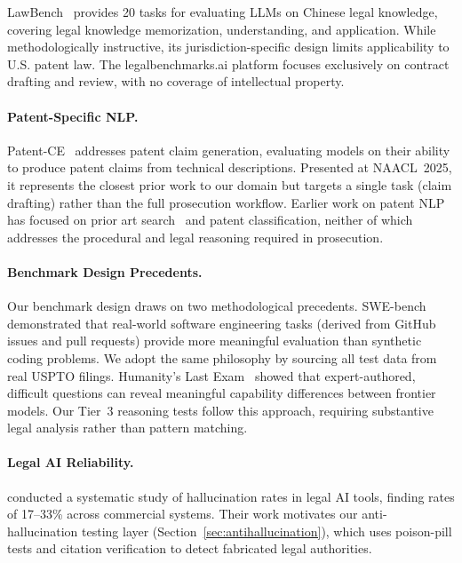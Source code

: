\documentclass[11pt]{article}
\begin{document}
LawBench~\citep{fei2023lawbench} provides 20 tasks for evaluating LLMs on Chinese legal knowledge, covering legal knowledge memorization, understanding, and application. While methodologically instructive, its jurisdiction-specific design limits applicability to U.S. patent law. The legalbenchmarks.ai platform focuses exclusively on contract drafting and review, with no coverage of intellectual property.

\paragraph{Patent-Specific NLP.}
Patent-CE~\citep{lee2025patentce} addresses patent claim generation, evaluating models on their ability to produce patent claims from technical descriptions. Presented at NAACL~2025, it represents the closest prior work to our domain but targets a single task (claim drafting) rather than the full prosecution workflow. Earlier work on patent NLP has focused on prior art search~\citep{helmers2019automating} and patent classification, neither of which addresses the procedural and legal reasoning required in prosecution.

\paragraph{Benchmark Design Precedents.}
Our benchmark design draws on two methodological precedents. SWE-bench~\citep{jimenez2023swebench} demonstrated that real-world software engineering tasks (derived from GitHub issues and pull requests) provide more meaningful evaluation than synthetic coding problems. We adopt the same philosophy by sourcing all test data from real USPTO filings. Humanity's Last Exam~\citep{phan2025humanitys} showed that expert-authored, difficult questions can reveal meaningful capability differences between frontier models. Our Tier~3 reasoning tests follow this approach, requiring substantive legal analysis rather than pattern matching.

\paragraph{Legal AI Reliability.}
\citet{magesh2025hallucination} conducted a systematic study of hallucination rates in legal AI tools, finding rates of 17--33\% across commercial systems. Their work motivates our anti-hallucination testing layer (Section~\ref{sec:antihallucination}), which uses poison-pill tests and citation verification to detect fabricated legal authorities.
\end{document}

